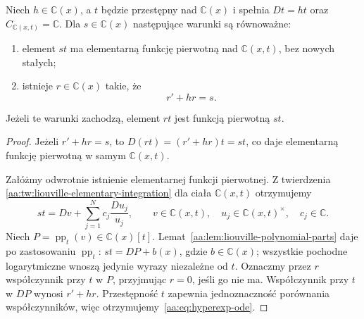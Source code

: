 \begin{twierdzenie}
\label{aa:tw:hyperexponential-criterion}
Niech $h\in\mathbb C(x)$, a $t$ będzie
przestępny nad $\mathbb C(x)$ i spełnia
$Dt=ht$ oraz $C_{\mathbb C(x,t)}=\mathbb C$.
Dla $s\in\mathbb C(x)$ następujące warunki
są równoważne:
\begin{enumerate}
\item element $st$ ma elementarną funkcję
pierwotną nad $\mathbb C(x,t)$, bez nowych stałych;
\item istnieje $r\in\mathbb C(x)$ takie, że
\begin{equation}\label{aa:eq:hyperexp-ode}
 r'+hr=s.
\end{equation}
\begingroup
\makeatletter
\protected@edef\@currentlabel{\p@equation\theequation}
\ifdefined\theHequation
  \edef\@currentHref{equation.\theHequation}
\fi
\label{eq:hyperexp}
\makeatother
\endgroup
\end{enumerate}
Jeżeli te warunki zachodzą, element $rt$
jest funkcją pierwotną $st$.
\end{twierdzenie}
\begin{proof}
Jeżeli $r'+hr=s$, to
$D(rt)=(r'+hr)t=st$,
co daje elementarną funkcję pierwotną
w samym $\mathbb C(x,t)$.

Załóżmy odwrotnie istnienie elementarnej
funkcji pierwotnej. Z twierdzenia
\ref{aa:tw:liouville-elementary-integration}
dla ciała $\mathbb C(x,t)$ otrzymujemy
\[
 st=Dv+\sum_{j=1}^N c_j\frac{Du_j}{u_j},
 \qquad v\in\mathbb C(x,t),\quad
 u_j\in\mathbb C(x,t)^\times,\quad
 c_j\in\mathbb C.
\]
Niech $P=\operatorname{pp}_t(v)\in\mathbb C(x)[t]$.
Lemat~\ref{aa:lem:liouville-polynomial-parts}
daje po zastosowaniu $\operatorname{pp}_t$:
$st=DP+b(x)$, gdzie $b\in\mathbb C(x)$;
wszystkie pochodne logarytmiczne wnoszą
jedynie wyrazy niezależne od $t$.
Oznaczmy przez $r$ współczynnik przy
$t$ w $P$, przyjmując $r=0$, jeśli go nie ma.
Współczynnik przy $t$ w $DP$ wynosi
$r'+hr$. Przestępność $t$ zapewnia
jednoznaczność porównania współczynników,
więc otrzymujemy~\eqref{aa:eq:hyperexp-ode}.
\end{proof}

